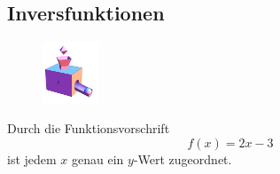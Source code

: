 \documentclass[%
11pt,%
twoside,%
titlepage,%
german,%
headsepline%
]{scrartcl}
\begin{document}
\subsection{Inversfunktionen}
\begin{figure}
  \begin{center}
    \includegraphics[width=0.15\textwidth]{pictures/maschine}
  \end{center}
\end{figure}
Durch die Funktionsvorschrift
$$f(x)=2x-3$$
ist jedem $x$ genau ein $y$-Wert zugeordnet.
\end{document}
